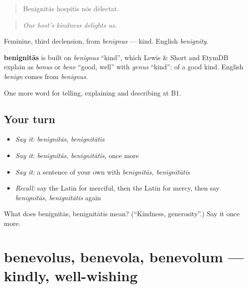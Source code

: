 \begin{quote}
Benignitās hospitis nōs dēlectat.
\end{quote}

\begin{quote}
\emph{Our host's kindness delights us.}
\end{quote}

Feminine, third declension, from \emph{benignus} — kind. English \emph{benignity}.

\begin{cousinweb}
\textbf{benignitās} is built on \emph{benignus} \textquotedblleft{}kind\textquotedblright{}, which Lewis \& Short and EtymDB explain as \emph{bonus} or \emph{bene} \textquotedblleft{}good, well\textquotedblright{} with \emph{genus} \textquotedblleft{}kind\textquotedblright{}: of a good kind. English \emph{benign} comes from \emph{benignus}.
\end{cousinweb}

\begin{grammarlens}[title={What you've built}]
One more word for telling, explaining and describing at B1.
\end{grammarlens}

\subsection*{Your turn}
\begin{itemize}
\raggedright
  \item \emph{Say it:} \emph{benignitās, benignitātis}
  \item \emph{Say it:} \emph{benignitās, benignitātis}, once more
  \item \emph{Say it:} a sentence of your own with \emph{benignitās, benignitātis}
  \item \emph{Recall:} say the Latin for merciful, then the Latin for mercy, then say \emph{benignitās, benignitātis} again
\end{itemize}

\begin{tcolorbox}[breakable,colback=teal!4,colframe=teal!35!black,title={Before you move on}]
What does benignitās, benignitātis mean? (\textquotedblleft{}Kindness, generosity\textquotedblright{}.) Say it once more.
\end{tcolorbox}
\section[benevolus, benevola, benevolum]{benevolus, benevola, benevolum — kindly, well-wishing}

